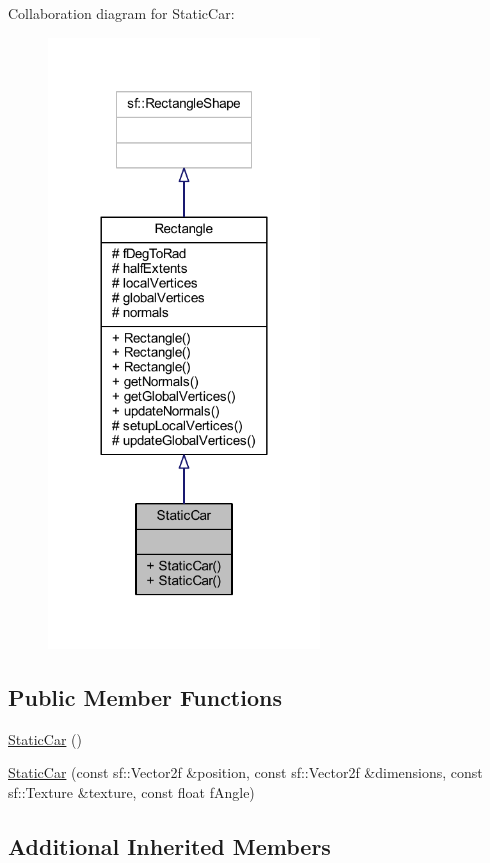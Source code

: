 Collaboration diagram for Static\+Car\+:\nopagebreak
\begin{figure}[H]
\begin{center}
\leavevmode
\includegraphics[width=204pt]{class_static_car__coll__graph}
\end{center}
\end{figure}
\subsection*{Public Member Functions}
\begin{DoxyCompactItemize}
\item 
\hyperlink{class_static_car_acb4b30c5dcb71e2aa2c48b0da9e4537b}{Static\+Car} ()
\item 
\hyperlink{class_static_car_a0242985cc1279fea1f6812bc61c30ca1}{Static\+Car} (const sf\+::\+Vector2f \&position, const sf\+::\+Vector2f \&dimensions, const sf\+::\+Texture \&texture, const float f\+Angle)
\end{DoxyCompactItemize}
\subsection*{Additional Inherited Members}


